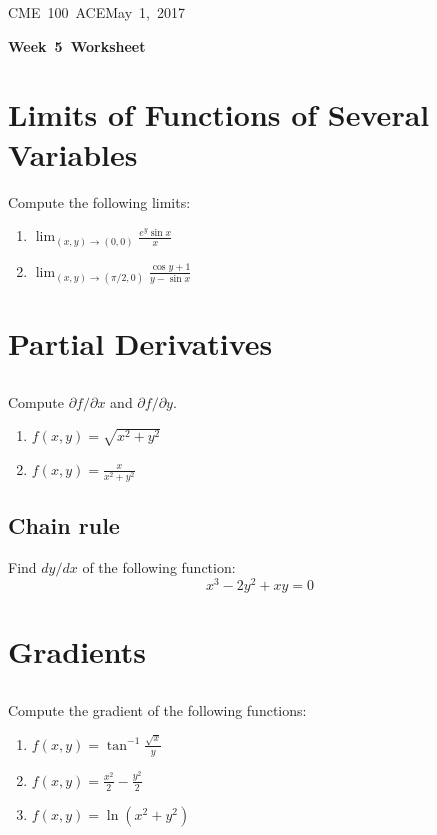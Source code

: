 \documentclass[letterpaper, 11pt]{article}
\makeatletter
\newcommand{\hmwkTitle}{Week\ 5\ Worksheet} %
\newcommand{\hmwkClass}{CME\ 100\ ACE} %
\newcommand{\hmwkAuthorName}{Timothy Anderson} %
\newcommand{\hmwkAuthorEmail}{timmya@stanford.edu} %
\makeatother
\begin{document}
\noindent
\normalsize 
\hmwkClass \hfill May\ 1,\ 2017\\

\begin{center} \Large \textbf{\hmwkTitle} \end{center}

\section{Limits of Functions of Several Variables}
Compute the following limits:
\begin{enumerate}[label=(\alph*)]
\item $\lim_{(x,y) \to (0,0)} \frac{e^y \sin x}{x} $

\item $\lim_{(x,y) \to (\pi/2,0)} \frac{ \cos y + 1}{ y- \sin x} $

\end{enumerate}

\section{Partial Derivatives}
\subsection{} Compute $\partial f / \partial x$ and $\partial f / \partial y$. 
\begin{enumerate}[label=(\alph*)]
\item $f(x,y) = \sqrt{x^2 + y^2}$

\item $f(x,y) = \frac{x}{x^2 + y^2}$

\end{enumerate}

\subsection{Chain rule} Find $dy/dx$ of the following function:
\[ x^3 - 2y^2+ xy=0 \]

\section{Gradients}
\subsection{} Compute the gradient of the following functions:
\begin{enumerate}[label=(\alph*)]
\item $f(x,y) = \tan^{-1} \frac{\sqrt{x}}{y} $


\item $f(x,y) = \frac{x^2}{2} - \frac{y^2}{2}$


\item $f(x,y) = \ln(x^2 + y^2) $


\end{enumerate}
\end{document}
